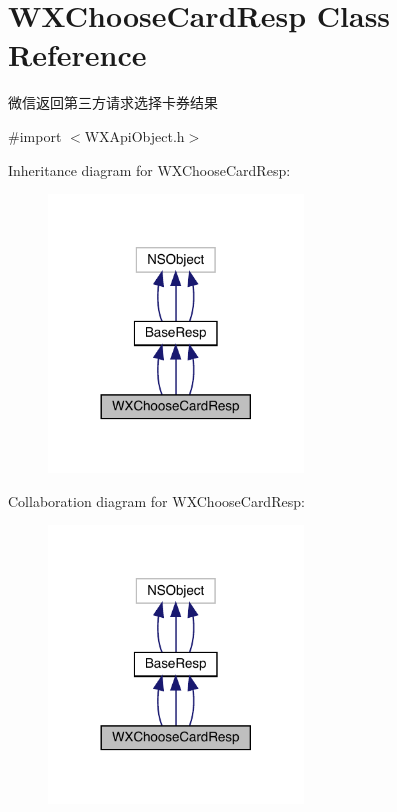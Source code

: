 \hypertarget{interface_w_x_choose_card_resp}{}\section{W\+X\+Choose\+Card\+Resp Class Reference}
\label{interface_w_x_choose_card_resp}


微信返回第三方请求选择卡券结果  




{\ttfamily \#import $<$W\+X\+Api\+Object.\+h$>$}



Inheritance diagram for W\+X\+Choose\+Card\+Resp\+:\nopagebreak
\begin{figure}[H]
\begin{center}
\leavevmode
\includegraphics[width=192pt]{interface_w_x_choose_card_resp__inherit__graph}
\end{center}
\end{figure}


Collaboration diagram for W\+X\+Choose\+Card\+Resp\+:\nopagebreak
\begin{figure}[H]
\begin{center}
\leavevmode
\includegraphics[width=192pt]{interface_w_x_choose_card_resp__coll__graph}
\end{center}
\end{figure}
